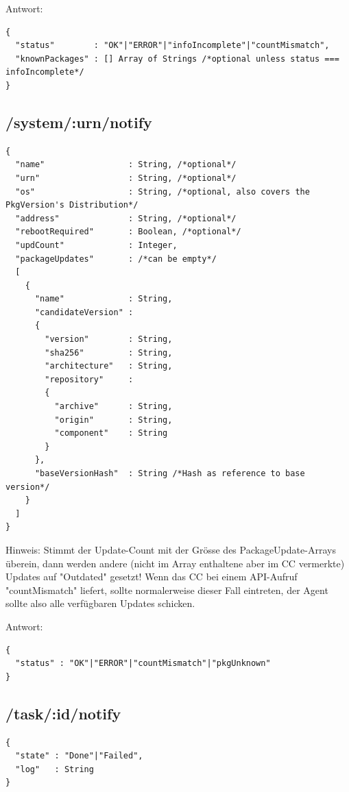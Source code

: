 Antwort:

\begin{verbatim}
{
  "status"        : "OK"|"ERROR"|"infoIncomplete"|"countMismatch",
  "knownPackages" : [] Array of Strings /*optional unless status === infoIncomplete*/
}
\end{verbatim}

\subsection*{/system/:urn/notify}

\begin{verbatim}
{
  "name"                 : String, /*optional*/
  "urn"                  : String, /*optional*/
  "os"                   : String, /*optional, also covers the PkgVersion's Distribution*/
  "address"              : String, /*optional*/
  "rebootRequired"       : Boolean, /*optional*/
  "updCount"             : Integer,
  "packageUpdates"       : /*can be empty*/
  [
    {
      "name"             : String,
      "candidateVersion" :
      {
        "version"        : String,
        "sha256"         : String,
        "architecture"   : String,
        "repository"     :
        {
          "archive"      : String,
          "origin"       : String,
          "component"    : String
        }
      },
      "baseVersionHash"  : String /*Hash as reference to base version*/
    }
  ]
}
\end{verbatim}

Hinweis: Stimmt der Update-Count mit der Grösse des PackageUpdate-Arrays überein, dann werden andere (nicht im Array enthaltene aber im CC vermerkte) Updates auf "Outdated" gesetzt! Wenn das CC bei einem API-Aufruf "countMismatch" liefert, sollte normalerweise dieser Fall eintreten, der Agent sollte also alle verfügbaren Updates schicken.


Antwort:

\begin{verbatim}
{
  "status" : "OK"|"ERROR"|"countMismatch"|"pkgUnknown"
}
\end{verbatim}

\subsection*{/task/:id/notify}

\begin{verbatim}
{
  "state" : "Done"|"Failed",
  "log"   : String
}
\end{verbatim}


